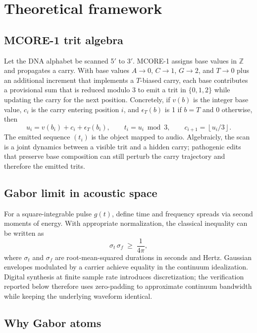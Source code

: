 \documentclass[preprint,12pt]{elsarticle}
\begin{document}
\section{Theoretical framework}

\subsection{MCORE-1 trit algebra}

Let the DNA alphabet be scanned 5$'$ to 3$'$. MCORE-1 assigns base values in $\mathbb{Z}$ and propagates a carry. With base values $A\!\rightarrow\!0$, $C\!\rightarrow\!1$, $G\!\rightarrow\!2$, and $T\!\rightarrow\!0$ plus an additional increment that implements a $T$-biased carry, each base contributes a provisional sum that is reduced modulo 3 to emit a trit in $\{0,1,2\}$ while updating the carry for the next position. Concretely, if $v(b)$ is the integer base value, $c_i$ is the carry entering position $i$, and $\epsilon_T(b)$ is 1 if $b=T$ and 0 otherwise, then
\begin{equation}
  u_i = v(b_i) + c_i + \epsilon_T(b_i), \qquad t_i = u_i \bmod 3, \qquad c_{i+1} = \left\lfloor u_i/3\right\rfloor .
\end{equation}
The emitted sequence $(t_i)$ is the object mapped to audio. Algebraicly, the scan is a joint dynamics between a visible trit and a hidden carry; pathogenic edits that preserve base composition can still perturb the carry trajectory and therefore the emitted trits.

\subsection{Gabor limit in acoustic space}

For a square-integrable pulse $g(t)$, define time and frequency spreads via second moments of energy. With appropriate normalization, the classical inequality can be written as
\begin{equation}
  \sigma_t \,\sigma_f \;\ge\; \frac{1}{4\pi},
\end{equation}
where $\sigma_t$ and $\sigma_f$ are root-mean-squared durations in seconds and Hertz. Gaussian envelopes modulated by a carrier achieve equality in the continuum idealization. Digital synthesis at finite sample rate introduces discretization; the verification reported below therefore uses zero-padding to approximate continuum bandwidth while keeping the underlying waveform identical.

\subsection{Why Gabor atoms}
\end{document}
